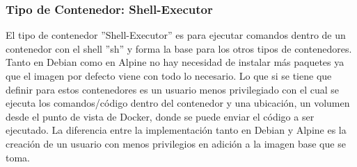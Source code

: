\subsubsection{Tipo de Contenedor: Shell-Executor}
El tipo de contenedor ''Shell-Executor'' es para ejecutar comandos dentro de un contenedor con el shell ''sh'' y forma la base para los otros tipos de contenedores. Tanto en Debian como en Alpine no hay necesidad de instalar más paquetes ya que el imagen por defecto viene con todo lo necesario. Lo que si se tiene que definir para estos contenedores es un usuario menos privilegiado con el cual se ejecuta los comandos/código dentro del contenedor y una ubicación, un volumen desde el punto de vista de Docker, donde se puede enviar el código a ser ejecutado. La diferencia entre la implementación tanto en Debian y Alpine es la creación de un usuario con menos privilegios en adición a la imagen base que se toma. 



